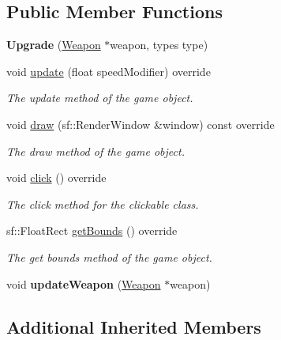 \subsection*{Public Member Functions}
\begin{DoxyCompactItemize}
\item 
\hypertarget{class_upgrade_aaad9a32e9ef265c0b7a1a63ea599a225}{{\bfseries Upgrade} (\hyperlink{class_weapon}{Weapon} $\ast$weapon, types type)}\label{class_upgrade_aaad9a32e9ef265c0b7a1a63ea599a225}

\item 
void \hyperlink{class_upgrade_a66b04bde03bdf6ad0935b98963619444}{update} (float speed\+Modifier) override
\begin{DoxyCompactList}\small\item\em The update method of the game object. \end{DoxyCompactList}\item 
void \hyperlink{class_upgrade_a01a806588165e9c9059343dec7cc52a3}{draw} (sf\+::\+Render\+Window \&window) const override
\begin{DoxyCompactList}\small\item\em The draw method of the game object. \end{DoxyCompactList}\item 
void \hyperlink{class_upgrade_a1ac674476147c05476d04b9bf6dc0b19}{click} () override
\begin{DoxyCompactList}\small\item\em The click method for the clickable class. \end{DoxyCompactList}\item 
sf\+::\+Float\+Rect \hyperlink{class_upgrade_a680e5842436c75191a9b0564e20ab70e}{get\+Bounds} () override
\begin{DoxyCompactList}\small\item\em The get bounds method of the game object. \end{DoxyCompactList}\item 
\hypertarget{class_upgrade_a8e86cea146dd2e9a4c69781d9c7d3c8d}{void {\bfseries update\+Weapon} (\hyperlink{class_weapon}{Weapon} $\ast$weapon)}\label{class_upgrade_a8e86cea146dd2e9a4c69781d9c7d3c8d}

\end{DoxyCompactItemize}
\subsection*{Additional Inherited Members}


